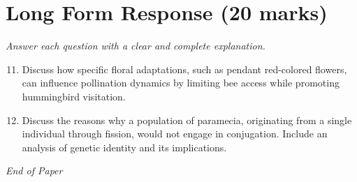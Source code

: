 \documentclass[12pt]{article}
\begin{document}
\section*{Long Form Response (20 marks)}
\textit{Answer each question with a clear and complete explanation.}
\begin{enumerate}[label=\arabic*.]
\setcounter{enumi}{10}
\item Discuss how specific floral adaptations, such as pendant red-colored flowers, can
influence pollination dynamics by limiting bee access while promoting hummingbird
visitation.
\item Discuss the reasons why a population of paramecia, originating from a single individual
through fission, would not engage in conjugation. Include an analysis of genetic identity
and its implications.
\end{enumerate}

\vfill
\noindent\textit{End of Paper}
\end{document}
